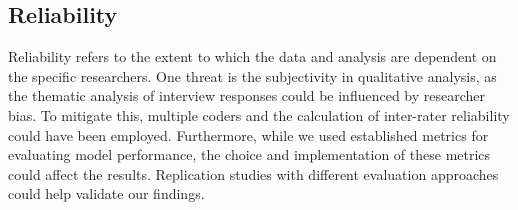 \subsection{Reliability}

Reliability refers to the extent to which the data and analysis are dependent on the specific researchers. One threat is the subjectivity in qualitative analysis, as the thematic analysis of interview responses could be influenced by researcher bias. To mitigate this, multiple coders and the calculation of inter-rater reliability could have been employed. Furthermore, while we used established metrics for evaluating model performance, the choice and implementation of these metrics could affect the results. Replication studies with different evaluation approaches could help validate our findings.

